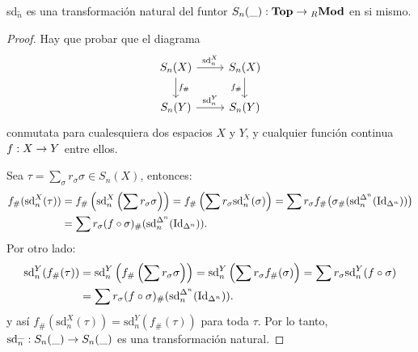\begin{ejercicio}\label{ej:72}
  sd${}^{\_}_n$ es una transformaci\'on natural del funtor $S_n(\_):\mathbf{Top}\rightarrow{}_R\mathbf{Mod}$
  en si mismo.
\end{ejercicio}
\begin{proof}%
  Hay que probar que el diagrama
  \[
    \begin{tikzcd}
      S_n(X) \arrow[r,"\text{sd}_n^X"] \arrow[d,"f_{\#}"] & S_n(X) \arrow[d,"f_{\#}"'] \\
      S_n(Y) \arrow[r,"\text{sd}^Y_n"] & S_n(Y)
    \end{tikzcd}
  \]
  conmutata para cualesquiera dos espacios $X$ y $Y$, y cualquier funci\'on continua
  $f:X\rightarrow Y$ entre ellos.

  Sea $\tau=\sum_{\sigma}r_{\sigma}\sigma\in S_n(X)$, entonces:
  \begin{align*}
    f_{\#}(\text{sd}^X_n(\tau))&=
    f_{\#}\left( \text{sd}^X_n\left( \sum r_{\sigma}\sigma \right) \right)=
    f_{\#}\left( \sum r_{\sigma}\text{sd}^X_n(\sigma) \right)=
    \sum r_{\sigma}f_{\#}\big(\sigma_{\#}(\text{sd}^{\Delta^n}_n(\text{Id}_{\Delta^n}))\big)\\ & =
    \sum r_{\sigma}(f\circ\sigma)_{\#}(\text{sd}^{\Delta^n}_n(\text{Id}_{\Delta^n})).
  \end{align*}
  Por otro lado:
  \begin{align*}
    \text{sd}^Y_n(f_{\#}(\tau))&=
    \text{sd}^Y_n\left( f_{\#}\left( \sum r_{\sigma}\sigma \right) \right)=
    \text{sd}^Y_n\left( \sum r_{\sigma}f_{\#}(\sigma) \right)=
    \sum r_{\sigma}\text{sd}^Y_n(f\circ\sigma)\\ & =
    \sum r_{\sigma}(f\circ\sigma)_{\#}(\text{sd}^{\Delta^n}_n(\text{Id}_{\Delta^n})).
  \end{align*}
  y as\'i $f_{\#}(\text{sd}^X_n(\tau))=\text{sd}^Y_n(f_{\#}(\tau))$ para toda $\tau.$ Por lo
  tanto, $\text{sd}_n^{\_}:S_n(\_)\rightarrow S_n(\_)$ es una transformaci\'on natural.
\end{proof}%

